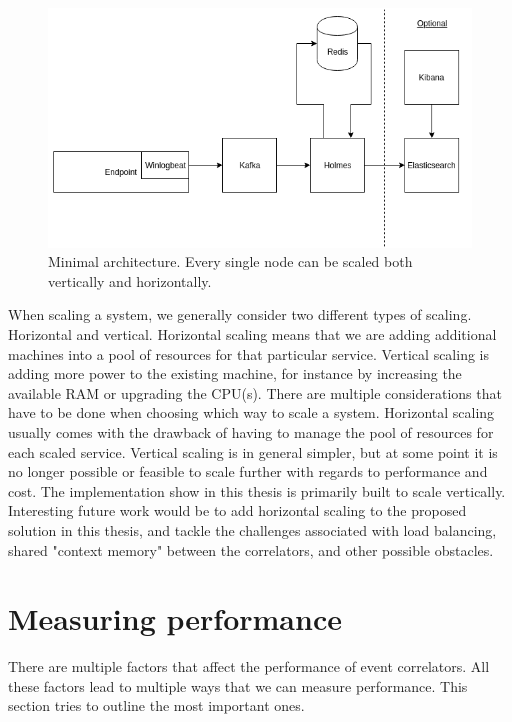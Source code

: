 \begin{figure}[ht]  %
  \centering
  \includegraphics[width=.85\textwidth]{figures/holmes-architecture}
  \caption[An example figure.]{Minimal architecture. Every single node can be scaled both vertically and horizontally.}
  \label{fig:example}
\end{figure}
When scaling a system, we generally consider two different types of scaling. Horizontal and vertical. Horizontal scaling means that we are adding additional machines into a pool of resources for that particular service. Vertical scaling is adding more power to the existing machine, for instance by increasing the available RAM or upgrading the CPU(s).
There are multiple considerations that have to be done when choosing which way to scale a system. Horizontal scaling usually comes with the drawback of having to manage the pool of resources for each scaled service. Vertical scaling is in general simpler, but at some point it is no longer possible or feasible to scale further with regards to performance and cost.
The implementation show in this thesis is primarily built to scale vertically.
Interesting future work would be to add horizontal scaling to the proposed solution in this thesis, and tackle the challenges associated with load balancing, shared "context memory" between the correlators, and other possible obstacles.


\section{Measuring performance}
\label{sec:measuring-performance}
There are multiple factors that affect the performance of event correlators. All these factors lead to multiple ways that we can measure performance. This section tries to outline the most important ones.

